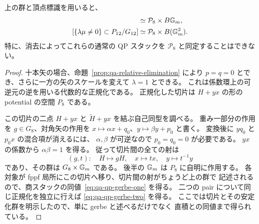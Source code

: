 \begin{proposition}
\label{prop:qa-stabilized-inertia}
上の群と頂点標識を用いると、
\begin{align}
 [\{\lambda\ne0\}\subset P_{10}^{\mathrm{odd}}/G_{10}]
   &\simeq \mathcal P_8\times B\Gm,\label{eq:qa-qp-gerbe-one}\\
 [\{\lambda\mu\ne0\}\subset P_{12}/G_{12}]
   &\simeq \mathcal P_8\times B(\Gm^2).
   \label{eq:qa-qp-gerbe-two}
\end{align}
特に、消去によってこれらの通常の QP スタックを
$\mathcal P_8$ と同定することはできない。
\end{proposition}

\begin{proof}
十本矢の場合、命題~\ref{prop:qa-relative-elimination} により
$p=q=0$ とでき、さらに一方の矢のスケールを変えて $\lambda=1$ とできる。
これは係数環上の可逆元の逆を用いる代数的な正規化である。
正規化した切片は $H+yx$ の形の potential の空間 $P_8$ である。

この切片の二点 $H+yx$ と $\widetilde H+yx$ を結ぶ自己同型を調べる。
重み一部分の作用を $g\in G_8$、対角矢の作用を
$x\mapsto\alpha x+q_0$、$y\mapsto\beta y+p_0$ と書く。
変換後に $yq_0$ と $p_0x$ の混合項が消えるには、
$\alpha,\beta$ が可逆なので $p_0=q_0=0$ が必要である。
$yx$ の係数から $\alpha\beta=1$ を得る。
従って切片間の全ての射は
\[
 (g,t):\quad H\longmapsto gH,\quad
 x\longmapsto tx,\quad y\longmapsto t^{-1}y
\]
であり、その群は $G_8\times\mathbb G_m$ である。
後半の $\mathbb G_m$ は $P_8$ に自明に作用する。
各対象が fppf 局所にこの切片へ移り、切片間の射がちょうど上の群で
記述されるので、商スタックの同値~\eqref{eq:qa-qp-gerbe-one} を得る。
二つの pair について同じ正規化を独立に行えば
\eqref{eq:qa-qp-gerbe-two} を得る。
ここでは切片とその安定化群を明示したので、単に gerbe と述べるだけでなく
直積との同値まで得られている。
\end{proof}

